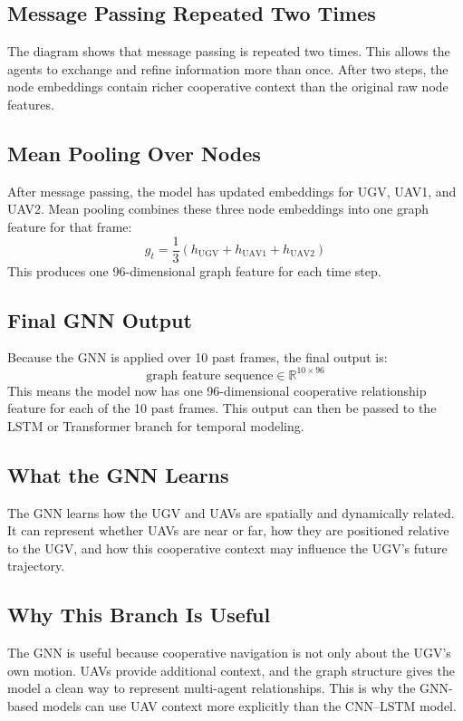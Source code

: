 \documentclass[11pt,a4paper]{article}
\begin{document}
\subsection*{Message Passing Repeated Two Times}
The diagram shows that message passing is repeated two times. This allows the
agents to exchange and refine information more than once. After two steps, the
node embeddings contain richer cooperative context than the original raw node
features.

\subsection*{Mean Pooling Over Nodes}
After message passing, the model has updated embeddings for UGV, UAV1, and
UAV2. Mean pooling combines these three node embeddings into one graph feature
for that frame:
\[
    g_t = \frac{1}{3}(h_{\text{UGV}} + h_{\text{UAV1}} + h_{\text{UAV2}})
\]
This produces one 96-dimensional graph feature for each time step.

\subsection*{Final GNN Output}
Because the GNN is applied over 10 past frames, the final output is:
\[
    \text{graph feature sequence} \in \mathbb{R}^{10 \times 96}
\]
This means the model now has one 96-dimensional cooperative relationship
feature for each of the 10 past frames. This output can then be passed to the
LSTM or Transformer branch for temporal modeling.

\subsection*{What the GNN Learns}
The GNN learns how the UGV and UAVs are spatially and dynamically related. It
can represent whether UAVs are near or far, how they are positioned relative to
the UGV, and how this cooperative context may influence the UGV's future
trajectory.

\subsection*{Why This Branch Is Useful}
The GNN is useful because cooperative navigation is not only about the UGV's
own motion. UAVs provide additional context, and the graph structure gives the
model a clean way to represent multi-agent relationships. This is why the
GNN-based models can use UAV context more explicitly than the CNN--LSTM model.
\end{document}
